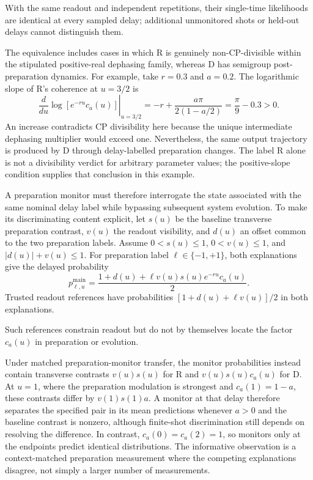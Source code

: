 \documentclass[11pt]{article}
\begin{document}
With the same readout and independent repetitions, their single-time likelihoods are identical at every sampled delay; additional unmonitored shots or held-out delays cannot distinguish them.

The equivalence includes cases in which R is genuinely non-CP-divisible within the stipulated positive-real dephasing family, whereas D has semigroup post-preparation dynamics. For example, take $r=0.3$ and $a=0.2$. The logarithmic slope of R's coherence at $u=3/2$ is
\[\left.\frac{d}{du}\log\!\left[e^{-ru}c_a(u)\right]\right|_{u=3/2}=-r+\frac{a\pi}{2(1-a/2)}=\frac{\pi}{9}-0.3>0.\]
An increase contradicts CP divisibility here because the unique intermediate dephasing multiplier would exceed one. Nevertheless, the same output trajectory is produced by D through delay-labelled preparation changes. The label R alone is not a divisibility verdict for arbitrary parameter values; the positive-slope condition supplies that conclusion in this example.

A preparation monitor must therefore interrogate the state associated with the same nominal delay label while bypassing subsequent system evolution. To make its discriminating content explicit, let $s(u)$ be the baseline transverse preparation contrast, $v(u)$ the readout visibility, and $d(u)$ an offset common to the two preparation labels. Assume $0<s(u)\leq1$, $0<v(u)\leq1$, and $|d(u)|+v(u)\leq1$. For preparation label $\ell\in\{-1,+1\}$, both explanations give the delayed probability
\[p_{\ell,u}^{\mathrm{main}}=\frac{1+d(u)+\ell v(u)s(u)e^{-ru}c_a(u)}{2}.\]
Trusted readout references have probabilities $[1+d(u)+\ell v(u)]/2$ in both explanations.

Such references constrain readout but do not by themselves locate the factor $c_a(u)$ in preparation or evolution.

Under matched preparation-monitor transfer, the monitor probabilities instead contain transverse contrasts $v(u)s(u)$ for R and $v(u)s(u)c_a(u)$ for D. At $u=1$, where the preparation modulation is strongest and $c_a(1)=1-a$, these contrasts differ by $v(1)s(1)a$. A monitor at that delay therefore separates the specified pair in its mean predictions whenever $a>0$ and the baseline contrast is nonzero, although finite-shot discrimination still depends on resolving the difference. In contrast, $c_a(0)=c_a(2)=1$, so monitors only at the endpoints predict identical distributions. The informative observation is a context-matched preparation measurement where the competing explanations disagree, not simply a larger number of measurements.
\end{document}
